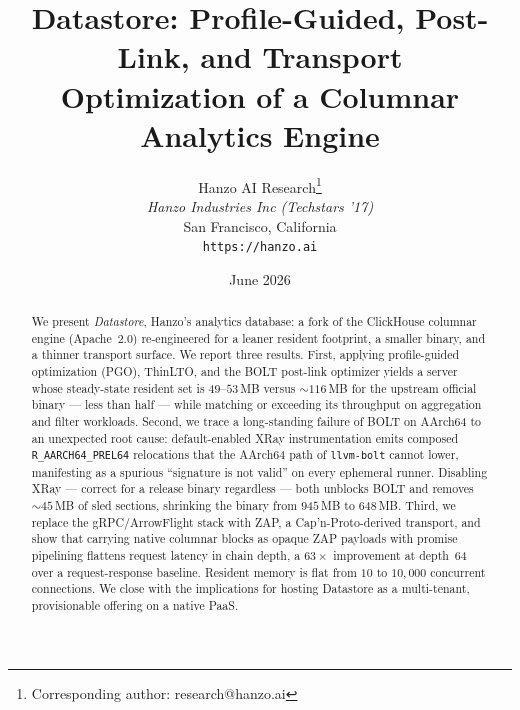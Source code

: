 \documentclass[11pt]{article}
\title{Datastore: Profile-Guided, Post-Link, and Transport\\ Optimization of a Columnar Analytics Engine}
\author{
    Hanzo AI Research\thanks{Corresponding author: research@hanzo.ai} \\
    \textit{Hanzo Industries Inc (Techstars '17)} \\
    San Francisco, California \\
    \texttt{https://hanzo.ai}
}
\date{June 2026}
\begin{document}
\hanzocoverpage

\begin{abstract}
We present \emph{Datastore}, Hanzo's analytics database: a fork of the
ClickHouse columnar engine (Apache~2.0) re-engineered for a leaner resident
footprint, a smaller binary, and a thinner transport surface. We report three
results. First, applying profile-guided optimization (PGO), ThinLTO, and the
BOLT post-link optimizer yields a server whose steady-state resident set is
$49$--$53$\,MB versus $\sim\!116$\,MB for the upstream official binary --- less
than half --- while matching or exceeding its throughput on aggregation and
filter workloads. Second, we trace a long-standing failure of BOLT on AArch64
to an unexpected root cause: default-enabled XRay instrumentation emits composed
\texttt{R\_AARCH64\_PREL64} relocations that the AArch64 path of \texttt{llvm-bolt}
cannot lower, manifesting as a spurious ``signature is not valid'' on every
ephemeral runner. Disabling XRay --- correct for a release binary regardless ---
both unblocks BOLT and removes $\sim\!45$\,MB of sled sections, shrinking the
binary from $945$\,MB to $648$\,MB. Third, we replace the gRPC/ArrowFlight stack
with ZAP, a Cap'n-Proto-derived transport, and show that carrying native
columnar blocks as opaque ZAP payloads with promise pipelining flattens
request latency in chain depth, a $63\times$ improvement at depth~64 over a
request-response baseline. Resident memory is flat from $10$ to $10{,}000$
concurrent connections. We close with the implications for hosting Datastore as
a multi-tenant, provisionable offering on a native PaaS.
\end{abstract}










\end{document}
